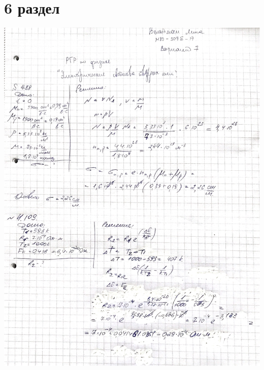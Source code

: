 \documentclass[12pt]{article}
\begin{document}
\section{6 раздел}
\begin{center}
\includegraphics[scale=0.2]{6_1.jpeg}\\
\vfill
\end{center}
\end{document}

